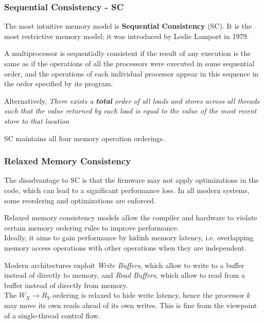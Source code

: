 \subsubsection{Sequential Consistency - SC}
The most intuitive memory model is \textbf{Sequential Consistency} (SC). It is the most restrictive memory model; it was introduced by Leslie Lamport in 1979.
\begin{definition}
   A multiprocessor is sequentially consistent if the result of any execution is the same as if the operations of all the processors were executed in some sequential order, and the operations of each individual processor appear in this sequence in the order specified by its program.
\end{definition}

Alternatively, \textit{There exists a \textbf{total} order of all loads and stores across all threads such that the value returned by each load is equal to the value of the most recent store to that location}

SC maintains all four memory operation orderings.

\subsubsection{Relaxed Memory Consistency}
The disadvantage to SC is that the firmware may not apply optimizations in the code, which can lead to a significant performance loss. In all modern systems, some reordering and optimizations are enforced.

Relaxed memory consistency models allow the compiler and hardware to violate certain memory ordering rules to improve performance.\\
Ideally, it aims to gain performance by hidinh memory latency, i.e. overlapping memory access operations with other operations when they are independent.

Modern architectures exploit \textit{Write Buffers}, which allow to write to a buffer instead of directly to memory, and \textit{Read Buffers}, which allow to read from a buffer instead of directly from memory.\\
The $W_X \rightarrow R_Y$ ordering is relaxed to hide write latency, hence the processor $k$ may move its own reads ahead of its own writes.
This is fine from the viewpoint of a single-thread control flow.

